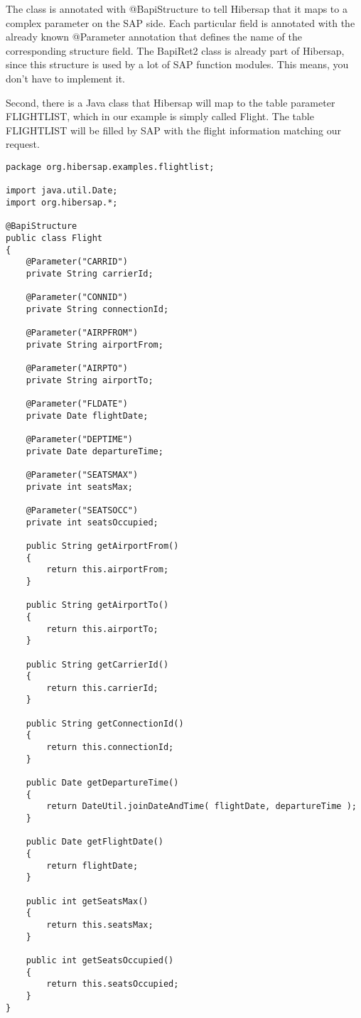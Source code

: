 The class is annotated with @BapiStructure to tell Hibersap that it maps to
a complex parameter on the SAP side. Each particular field is annotated with the
already known @Parameter annotation that defines the name of the corresponding structure field.
The BapiRet2 class is already part of Hibersap, since this structure is used by a lot of
SAP function modules. This means, you don't have to implement it.

Second, there is a Java class that Hibersap will map to the table parameter FLIGHTLIST,
which in our example is simply called Flight.
The table FLIGHTLIST will be filled by SAP with the flight information matching our request.

\begin{lstlisting}[caption=The Flight class]
package org.hibersap.examples.flightlist;

import java.util.Date;
import org.hibersap.*;

@BapiStructure
public class Flight
{
    @Parameter("CARRID")
    private String carrierId;

    @Parameter("CONNID")
    private String connectionId;

    @Parameter("AIRPFROM")
    private String airportFrom;

    @Parameter("AIRPTO")
    private String airportTo;

    @Parameter("FLDATE")
    private Date flightDate;

    @Parameter("DEPTIME")
    private Date departureTime;

    @Parameter("SEATSMAX")
    private int seatsMax;

    @Parameter("SEATSOCC")
    private int seatsOccupied;

    public String getAirportFrom()
    {
        return this.airportFrom;
    }

    public String getAirportTo()
    {
        return this.airportTo;
    }

    public String getCarrierId()
    {
        return this.carrierId;
    }

    public String getConnectionId()
    {
        return this.connectionId;
    }

    public Date getDepartureTime()
    {
        return DateUtil.joinDateAndTime( flightDate, departureTime );
    }

    public Date getFlightDate()
    {
        return flightDate;
    }

    public int getSeatsMax()
    {
        return this.seatsMax;
    }

    public int getSeatsOccupied()
    {
        return this.seatsOccupied;
    }
}
\end{lstlisting}

